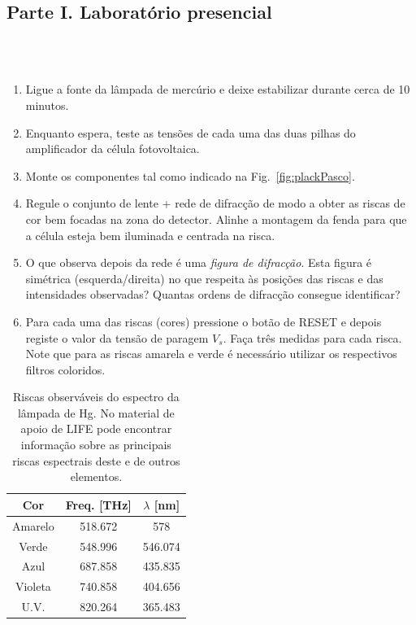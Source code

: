 \documentclass[a4paper,twoside,11pt]{report}      %
\begin{document}
\subsection*{\sf Parte I. Laboratório presencial}
\\ \\


\begin{enumerate}
\item Ligue a fonte da lâmpada de mercúrio e deixe estabilizar durante cerca de 10 minutos.
\item Enquanto espera, teste as tensões de cada uma das duas pilhas do amplificador da célula fotovoltaica.
\item Monte os componentes tal como indicado na Fig.~\ref{fig:plackPasco}.
\item Regule o conjunto de lente + rede de difracção de modo a obter as riscas de cor bem focadas na zona do detector. Alinhe a montagem da fenda para que a célula esteja bem iluminada e centrada na risca.
\item O que observa depois da rede é uma \emph{figura de difracção}. 
Esta figura é simétrica (esquerda/direita) no que respeita às posições das riscas e das intensidades observadas? Quantas ordens de difracção consegue identificar?
\item Para cada uma das riscas (cores) pressione o botão de RESET e depois registe o valor da tensão de paragem $V_s$. Faça três medidas para cada risca. Note que para as riscas amarela e verde é necessário utilizar os respectivos filtros coloridos.
\end{enumerate}

\begin{table}[!hbp]
\begin{center}
	\begin{tabular}{|c|c|c|}
	\hline
	Cor  & Freq. [THz] & $\lambda$ [nm]  \\
	\hline
	Amarelo & 518.672 & 578 \\
	Verde & 548.996 & 546.074\\
	Azul & 687.858  & 435.835 \\
	Violeta & 740.858  & 404.656\\
	U.V.    & 820.264  & 365.483 \\
	\hline
 	\end{tabular}
	\caption{Riscas observáveis do espectro da lâmpada de Hg. No material de apoio de LIFE pode encontrar informação sobre as principais riscas espectrais deste e de outros elementos.} 
	\label{tab:Hg}
	\end{center}
\end{table}
\end{document}
